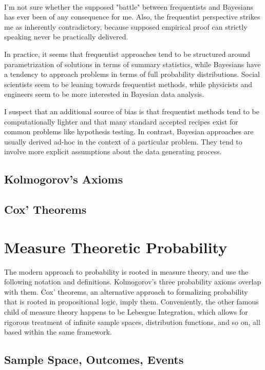 \paragraph{} I'm not sure whether the supposed "battle" between frequentists and Bayesians has ever been of any consequence for me. Also, the frequentist perspective strikes me as inherently contradictory, because supposed empirical proof can strictly speaking never be practically delivered.

In practice, it seems that frequentist approaches tend to be structured around parametrization of solutions in terms of summary statistics, while Bayesians have a tendency to approach problems in terms of full probability distributions. Social scientists seem to be leaning towards frequentist methods, while physicists and engineers seem to be more interested in Bayesian data analysis. 

I suspect that an additional source of bias is that frequentist methods tend to be computationally lighter and that many standard accepted recipes exist for common problems like hypothesis testing. In contrast, Bayesian approaches are usually derived ad-hoc in the context of a particular problem. They tend to involve more explicit assumptions about the data generating process.

\subsection{Kolmogorov's Axioms}
\subsection{Cox' Theorems}

\section{Measure Theoretic Probability}
The modern approach to probability is rooted in measure theory, and use the following notation and definitions. Kolmogorov's three probability axioms overlap with them. Cox' theorems, an alternative approach to formalizing probability that is rooted in propositional logic, imply them. Conveniently, the other famous child of measure theory happens to be Lebesgue Integration, which allows for rigorous treatment of infinite sample spaces, distribution functions, and so on, all based within the same framework. 

\subsection{Sample Space, Outcomes, Events}

